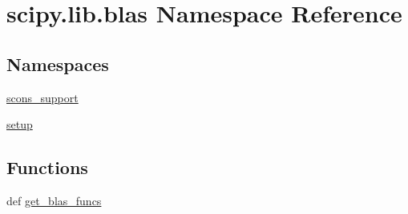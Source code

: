 \hypertarget{namespacescipy_1_1lib_1_1blas}{}\section{scipy.\+lib.\+blas Namespace Reference}
\label{namespacescipy_1_1lib_1_1blas}
\subsection*{Namespaces}
\begin{DoxyCompactItemize}
\item 
 \hyperlink{namespacescipy_1_1lib_1_1blas_1_1scons__support}{scons\+\_\+support}
\item 
 \hyperlink{namespacescipy_1_1lib_1_1blas_1_1setup}{setup}
\end{DoxyCompactItemize}
\subsection*{Functions}
\begin{DoxyCompactItemize}
\item 
def \hyperlink{namespacescipy_1_1lib_1_1blas_ad990eae2f5ced520bf4de13a2d0a7cc0}{get\+\_\+blas\+\_\+funcs}
\end{DoxyCompactItemize}
